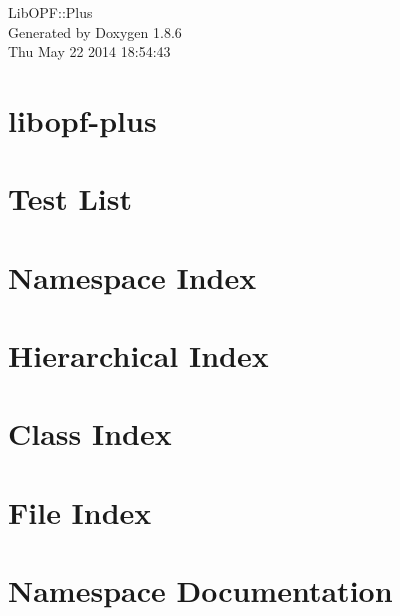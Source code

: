 \documentclass[twoside]{book}
\newcommand{\+}{\discretionary{\mbox{\scriptsize$\hookleftarrow$}}{}{}}
\newcommand{\clearemptydoublepage}{%
  \newpage{\pagestyle{empty}\cleardoublepage}%
}
\begin{document}
\hypersetup{pageanchor=false,
             bookmarks=true,
             bookmarksnumbered=true,
             pdfencoding=unicode
            }
\begin{titlepage}
\vspace*{7cm}
\begin{center}%
{\Large Lib\+O\+P\+F\+:\+:Plus }\\
\vspace*{1cm}
{\large Generated by Doxygen 1.8.6}\\
\vspace*{0.5cm}
{\small Thu May 22 2014 18:54:43}\\
\end{center}
\end{titlepage}
\clearemptydoublepage
\tableofcontents
\clearemptydoublepage
{}
\hypersetup{pageanchor=true}

\chapter{libopf-\/plus}
\label{md_README}
\hypertarget{md_README}{}

\chapter{Test List}
\label{test}
\hypertarget{test}{}

\chapter{Namespace Index}

\chapter{Hierarchical Index}

\chapter{Class Index}

\chapter{File Index}

\chapter{Namespace Documentation}




\end{document}
